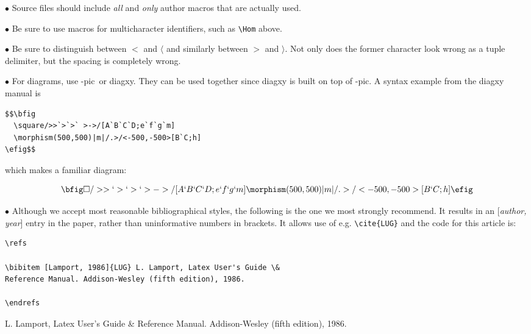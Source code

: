 \documentclass{tac}
\def\xypic{\hbox{\rm\Xy-pic}}
\def\xypic{\hbox{\rm\Xy-pic}}
\begin{document}
\begin{list}{}{}
\item[$\bullet$] Source files should include \emph{all} and
\emph{only} author macros that are actually used. \item[$\bullet$]
Be sure to use macros for multicharacter identifiers, such as
\verb.\Hom. above. 
\item[$\bullet$] Be sure to distinguish between
$<$ and $\langle$ and similarly between $>$ and $\rangle$.  Not
only does the former character look wrong as a tuple delimiter,
but the spacing is completely wrong. 
\item[$\bullet$] For diagrams, use \xypic\ or diagxy.%
They can be used together since diagxy is built on top of
\xypic. A syntax example from the diagxy manual is
\begin{verbatim}
$$\bfig
  \square/>>`>`>` >->/[A`B`C`D;e`f`g`m]
  \morphism(500,500)|m|/.>/<-500,-500>[B`C;h]
\efig$$
\end{verbatim}
which makes a familiar diagram:

$$\bfig
 \square/>>`>`>` >->/[A`B`C`D;e`f`g`m]
 \morphism(500,500)|m|/.>/<-500,-500>[B`C;h]
\efig$$
\item[$\bullet$] Although we accept most reasonable bibliographical styles, the
 following is the one we most strongly recommend.  It results in an 
 [\emph{author, year}] entry in the paper, rather than uninformative numbers in
 brackets. It allows use of e.g. \verb.\cite{LUG}. and the code for this article is:
\begin{verbatim}
\refs

\bibitem [Lamport, 1986]{LUG} L. Lamport, Latex User's Guide \&
Reference Manual. Addison-Wesley (fifth edition), 1986.

\endrefs
\end{verbatim}
\end{list}



 L. Lamport, Latex User's Guide \&
Reference Manual. Addison-Wesley (fifth edition), 1986.

\endrefs
\end{document}
